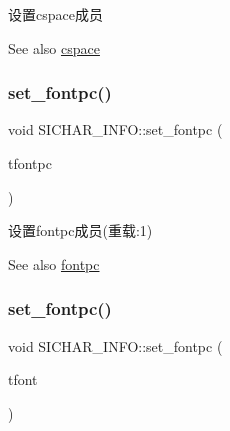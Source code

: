 设置cspace成员 

\begin{DoxySeeAlso}{See also}
\hyperlink{class_s_i_c_h_a_r___i_n_f_o_a575d876eda778563dec0f72bd4bc06ea}{cspace} 
\end{DoxySeeAlso}
\mbox{\label{class_s_i_c_h_a_r___i_n_f_o_a7dd5af8833b1951a6e4759668d484f37}} 
\subsubsection{\texorpdfstring{set\+\_\+fontpc()}{set\_fontpc()}\hspace{0.1cm}{\footnotesize\ttfamily [1/2]}}
{\footnotesize\ttfamily void S\+I\+C\+H\+A\+R\+\_\+\+I\+N\+F\+O\+::set\+\_\+fontpc (\begin{DoxyParamCaption}\item[{S\+I\+F\+O\+N\+T\+\_\+P}]{tfontpc }\end{DoxyParamCaption})\hspace{0.3cm}{\ttfamily [inline]}}



设置fontpc成员(重载\+:1) 

\begin{DoxySeeAlso}{See also}
\hyperlink{class_s_i_c_h_a_r___i_n_f_o_a8d998c494943882d98981f79f620460d}{fontpc} 
\end{DoxySeeAlso}
\mbox{\label{class_s_i_c_h_a_r___i_n_f_o_a01ad1057400db3ccec680de26f4ab0a2}} 
\subsubsection{\texorpdfstring{set\+\_\+fontpc()}{set\_fontpc()}\hspace{0.1cm}{\footnotesize\ttfamily [2/2]}}
{\footnotesize\ttfamily void S\+I\+C\+H\+A\+R\+\_\+\+I\+N\+F\+O\+::set\+\_\+fontpc (\begin{DoxyParamCaption}\item[{S\+I\+F\+O\+NT \&}]{tfont }\end{DoxyParamCaption})\hspace{0.3cm}{\ttfamily [inline]}}




